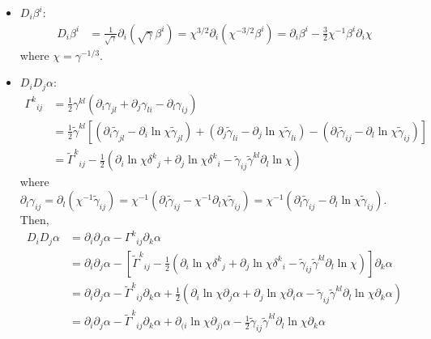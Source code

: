 \documentclass[prd,aps,a4paper,superscriptaddress,onecolumn,footinbib]{revtex4}
\begin{document}
\begin{itemize}
\item $D_i\beta^i$:
  \begin{align}
    D_i\beta^i
    &=\frac{1}{\sqrt{\gamma}}\partial_i\left(\sqrt{\gamma}\beta^i\right)
    =\chi^{3/2}\partial_i\left(\chi^{-3/2}\beta^i\right)
    =\partial_i\beta^i-\frac{3}{2}\chi^{-1}\beta^i\partial_i\chi
  \end{align}
  where $\chi=\gamma^{-1/3}$.
\item $D_iD_j\alpha$:
  \begin{align}
    \Gamma^{k}{}_{ij}
    &=\frac{1}{2}\gamma^{kl}(\partial_i\gamma_{jl}+\partial_j\gamma_{li}-\partial_l\gamma_{ij})
    \\
    &=\frac{1}{2}\tilde\gamma^{kl}
    \left[
      (\partial_i\tilde\gamma_{jl}-\partial_i\ln\chi\tilde\gamma_{jl})+
      (\partial_j\tilde\gamma_{li}-\partial_j\ln\chi\tilde\gamma_{li})-
      (\partial_l\tilde\gamma_{ij}-\partial_l\ln\chi\tilde\gamma_{ij})
    \right]
    \\
    &=\tilde\Gamma^k{}_{ij}
    -\frac{1}{2}
    (\partial_i\ln\chi\delta^k{}_j+\partial_j\ln\chi\delta^k{}_i
    -\tilde\gamma_{ij}\tilde\gamma^{kl}\partial_l\ln\chi)
  \end{align}
  where
  $\partial_l\gamma_{ij}=\partial_l(\chi^{-1}\tilde\gamma_{ij})
  =\chi^{-1}(\partial_l\tilde{\gamma}_{ij}-\chi^{-1}\partial_l\chi\tilde\gamma_{ij})
  =\chi^{-1}(\partial_l\tilde{\gamma}_{ij}-\partial_l\ln\chi\tilde\gamma_{ij})$.
  Then,
  \begin{align}
    D_iD_j\alpha
    &=\partial_i\partial_j\alpha-\Gamma^k{}_{ij}\partial_k\alpha \\
    &=\partial_i\partial_j\alpha-
    \left[
      \tilde\Gamma^k{}_{ij}
      -\frac{1}{2}
      (\partial_i\ln\chi\delta^k{}_j+\partial_j\ln\chi\delta^k{}_i
      -\tilde\gamma_{ij}\tilde\gamma^{kl}\partial_l\ln\chi)
    \right]\partial_k\alpha \\
    &=\partial_i\partial_j\alpha-
    \tilde\Gamma^k{}_{ij}\partial_k\alpha
    +\frac{1}{2}
    (\partial_i\ln\chi\partial_j\alpha
    +\partial_j\ln\chi\partial_i\alpha
    -\tilde\gamma_{ij}\tilde\gamma^{kl}\partial_l\ln\chi\partial_k\alpha) \\
    &=\partial_i\partial_j\alpha-
    \tilde\Gamma^k{}_{ij}\partial_k\alpha
    +\partial_{(i}\ln\chi\partial_{j)}\alpha
    -\frac{1}{2}\tilde\gamma_{ij}\tilde\gamma^{kl}\partial_l\ln\chi\partial_k\alpha
  \end{align}


\end{itemize}
\end{document}
